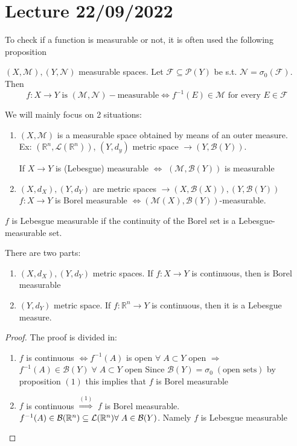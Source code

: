 \section{Lecture 22/09/2022}
To check if a function is measurable or not, it is often used the following proposition
\begin{proposition}
    \((X, \mathcal{M}), (Y, \mathcal{N})\) measurable spaces. Let \(\mathcal{F} \subseteq \mathcal{P}(Y)\) be s.t. \(\mathcal{N} = \sigma_0(\mathcal{F})\). Then
    \[
        f: X \to Y \mbox{ is } (\mathcal{M}, \mathcal{N})-\mbox{measurable} \Leftrightarrow f^{-1}(E) \in \mathcal{M} \mbox{ for every } E \in \mathcal{F}
    \]
\end{proposition}

We will mainly focus on 2 situations:
\begin{enumerate}
    \item  \((X, \mathcal{M})\) is a measurable space obtained by means of an outer measure. \\
    Ex: \((\mathbb{R}^n, \mathcal{L}(\mathbb{R}^n))\), \((Y, d_y)\) metric space \(\to (Y, \mathcal{B}(Y))\). 

    If \(X \to Y\) is (Lebesgue) measurable \(\Leftrightarrow\) \((\mathcal{M}, \mathcal{B}(Y))\) is measurable

    \item \((X, d_X), (Y, d_Y)\) are metric spaces \(\longrightarrow (X, \mathcal{B}(X)), (Y, \mathcal{B}(Y))\) \\
    \(f: X \to Y\) is Borel measurable \(\Leftrightarrow (\mathcal{M}(X), \mathcal{B}(Y)) \)-measurable.
\end{enumerate}
\begin{remark}
     \(f\) is Lebesgue measurable if the continuity of the Borel set is a Lebesgue-measurable set.
\end{remark}
\begin{proposition}
    There are two parts:
    \begin{enumerate}
        \item \((X, d_X), (Y, d_Y)\) metric spaces. If \(f:X \to Y\) is continuous, then is Borel measurable
        \item \((Y, d_Y)\) metric space. If \(f:\mathbb{R}^n \to Y\) is continuous, then it is a Lebesgue measure.
    \end{enumerate}
\end{proposition}
\begin{proof}
    The proof is divided in:
    \begin{enumerate}
        \item \(f\) is continuous \(\Leftrightarrow f^{-1}(A)\) is open \(\forall \; A \subset Y\)
        open \(\Rightarrow\) \(f^{-1}(A) \in \mathcal{B}(Y) \; \forall \; A \subset Y\) open
        Since \(\mathcal{B}(Y) = \sigma_0 \; (\mbox{open sets})\) by proposition \((1)\) this implies that \(f\) is Borel measurable
        \item \(f\) is continuous \(\overset{(1)}{\Rightarrow}\) \(f\) is Borel measurable.
        \(f^{-1}(A) \in \mathcal{B}(\mathbb{R}^n) \subseteq \mathcal{L}(\mathbb{R}^n) \forall \; A \in \mathcal{B}(Y)\). Namely \(f\) is Lebesgue measurable
    \end{enumerate}
\end{proof}
